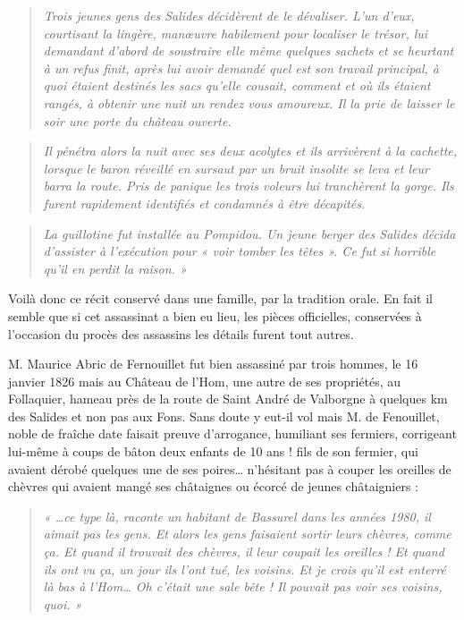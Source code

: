 \begin{quote}
\textit{Trois jeunes gens des Salides décidèrent de le dévaliser. L’un d’eux, courtisant la lingère,
manœuvre habilement pour localiser le trésor, lui demandant d’abord de soustraire elle
même quelques sachets et se heurtant à un refus finit, après lui avoir demandé quel est son
travail principal, à quoi étaient destinés les sacs qu’elle cousait, comment et où ils étaient
rangés, à obtenir une nuit un rendez vous amoureux. Il la prie de laisser le soir une porte du
château ouverte.}
\end{quote}

\begin{quote}
\textit{Il pénétra alors la nuit avec ses deux acolytes et ils arrivèrent à la cachette, lorsque le baron
réveillé en sursaut par un bruit insolite se leva et leur barra la route. Pris de panique les trois
voleurs lui tranchèrent la gorge. Ils furent rapidement identifiés et condamnés à être
décapités.}
\end{quote}

\begin{quote}
\textit{La guillotine fut installée au Pompidou. Un jeune berger des Salides décida d’assister à
l’exécution pour « voir tomber les têtes ». Ce fut si horrible qu’il en perdit la raison. »}
\end{quote}


Voilà donc ce récit conservé dans une famille, par la tradition orale. En fait il semble que si
cet assassinat a bien eu lieu, les pièces officielles, conservées à l’occasion du procès des
assassins les détails furent tout autres.

M. Maurice Abric de Fernouillet fut bien assassiné par trois hommes, le 16 janvier 1826 mais
au Château de l’Hom, une autre de ses propriétés, au Follaquier, hameau près de la route de
Saint André de Valborgne à quelques km des Salides et non pas aux Fons.
Sans doute y eut-il vol mais M. de Fenouillet, noble de fraîche date faisait preuve
d’arrogance, humiliant ses fermiers, corrigeant lui-même à coups de bâton deux enfants de 10
ans ! fils de son fermier, qui avaient dérobé quelques une de ses poires… n’hésitant pas à
couper les oreilles de chèvres qui avaient mangé ses châtaignes ou écorcé de jeunes
châtaigniers :

\begin{quote}
\textit{« …ce type là, raconte un habitant de Bassurel dans les années 1980, il aimait pas les gens.
Et alors les gens faisaient sortir leurs chèvres, comme ça. Et quand il trouvait des chèvres, il
leur coupait les oreilles ! Et quand ils ont vu ça, un jour ils l’ont tué, les voisins. Et je crois
qu’il est enterré là bas à l’Hom… Oh c’était une sale bête ! Il pouvait pas voir ses voisins,
quoi. »}
\end{quote}


